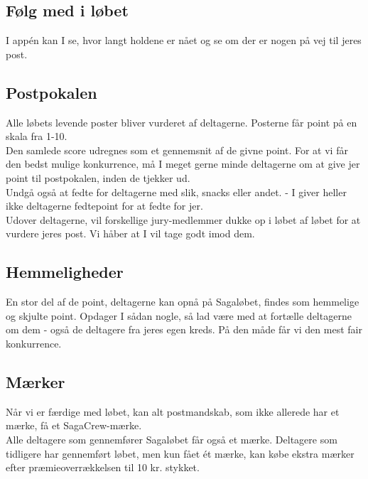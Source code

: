 \subsection{Følg med i løbet}
I app\'en kan I se, hvor langt holdene er nået og se om der er nogen på vej til jeres post.
\subsection{Postpokalen}
Alle løbets levende poster bliver vurderet af deltagerne. Posterne får point på en skala fra 1-10.\\
Den samlede score udregnes som et gennemsnit af de givne point. For at vi får den bedst mulige konkurrence, må I meget gerne minde deltagerne om at give jer point til postpokalen, inden de tjekker ud.\\
Undgå også at fedte for deltagerne med slik, snacks eller andet. - I giver heller ikke deltagerne fedtepoint for at fedte for jer.\\
\newline
Udover deltagerne, vil forskellige jury-medlemmer dukke op i løbet af løbet for at vurdere jeres post. Vi håber at I vil tage godt imod dem.
\subsection{Hemmeligheder}
En stor del af de point, deltagerne kan opnå på Sagaløbet, findes som hemmelige og skjulte point. Opdager I sådan nogle, så lad være med at fortælle deltagerne om dem - også de deltagere fra jeres egen kreds. På den måde får vi den mest fair konkurrence.
\newpage
\vspace*{.4cm}
\subsection{Mærker}
Når vi er færdige med løbet, kan alt postmandskab, som ikke allerede har et mærke, få et SagaCrew-mærke.\\
Alle deltagere som gennemfører Sagaløbet får også et mærke. Deltagere som tidligere har gennemført løbet, men kun fået ét mærke, kan købe ekstra mærker efter præmieoverrækkelsen til 10 kr. stykket.
